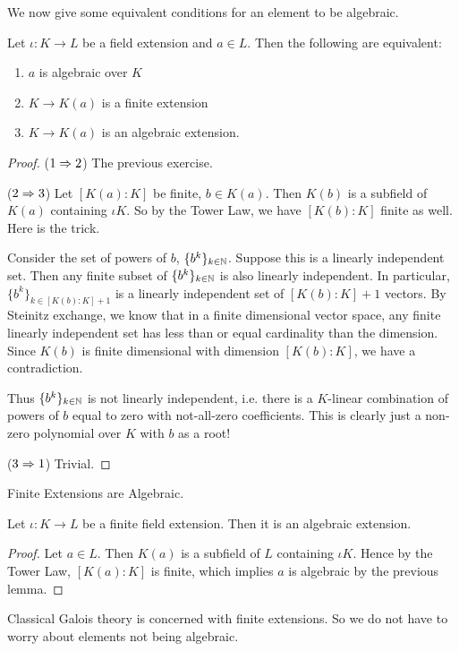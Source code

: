\documentclass[../book.tex]{subfiles}
\begin{document}
We now give some equivalent conditions for an element to be algebraic.
\begin{lem}
    Let $\iota : K \to L$ be a field extension and $a \in L$. 
    Then the following are equivalent:
    \begin{enumerate}
        \item $a$ is algebraic over $K$
        \item $K \to K(a)$ is a finite extension
        \item $K \to K(a)$ is an algebraic extension.
    \end{enumerate}
\end{lem}
\begin{proof}
    ($1 \Rightarrow 2$)
        The previous exercise.
        
    ($2 \Rightarrow 3$)
        Let $[K(a):K]$ be finite, $b \in K(a)$.
        Then $K(b)$ is a subfield of $K(a)$ containing $\iota K$. 
        So by the Tower Law, we have $[K(b):K]$ finite as well.
        Here is the trick. 
        
        Consider the set of powers of $b$, $\{b^k\}_{k\in\mathbb{N}}$.
        Suppose this is a linearly independent set.
        Then any finite subset of $\{b^k\}_{k\in\mathbb{N}}$ is also linearly independent.
        In particular, $\{b^k\}_{k\in[K(b):K]+1}$ is a linearly independent set
        of $[K(b):K]+1$ vectors.
        By Steinitz exchange, we know that in a finite dimensional vector space, 
        any finite linearly independent set has less than or equal cardinality
        than the dimension. 
        Since $K(b)$ is finite dimensional with dimension $[K(b):K]$,
        we have a contradiction.
        
        Thus $\{b^k\}_{k\in\mathbb{N}}$ is not linearly independent, i.e.
        there is a $K$-linear combination of powers of $b$ equal to zero
        with not-all-zero coefficients.
        This is clearly just a non-zero polynomial over $K$ 
        with $b$ as a root!
        
    ($3 \Rightarrow 1$)
        Trivial.
\end{proof}
\begin{thm} Finite Extensions are Algebraic.

    Let $\iota : K \to L$ be a finite field extension. 
    Then it is an algebraic extension.
\end{thm}
\begin{proof}
    Let $a \in L$. Then $K(a)$ is a subfield of $L$ containing $\iota K$.
    Hence by the Tower Law, $[K(a) : K]$ is finite,
    which implies $a$ is algebraic by the previous lemma. 
\end{proof}
\begin{rmk}
    Classical Galois theory is concerned with finite extensions.
    So we do not have to worry about elements not being algebraic. 
\end{rmk}
\end{document}
